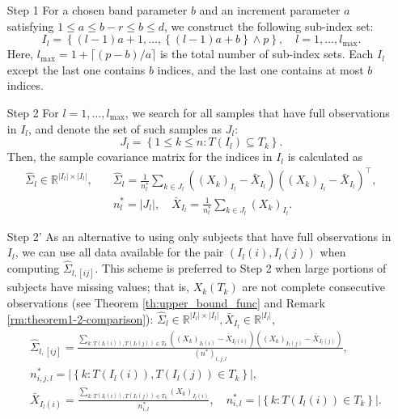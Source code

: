 \documentclass[11pt]{article}
\newcommand{\0}{{\mathbf{0}}}
\newcommand{\1}{{\mathbf{1}}}
\begin{document}
\begin{enumerate}
	\item[Step 1] For a chosen band parameter $b$ and an increment parameter $a$ satisfying $1\leq a \leq b-r \leq b\leq d$, we construct the following sub-index set:
	\begin{equation}\label{eq:I_l}
	I_l = \left\{(l-1)a + 1, \ldots, \left\{(l-1)a + b\right\}\wedge p \right\}, \quad l=1,\ldots, l_{\max}.
	\end{equation}
	Here, $l_{\max} = 1+ \lceil (p-b)/a \rceil$ is the total number of sub-index sets. Each $I_l$ except the last one contains $b$ indices, and the last one contains at most $b$ indices.
	
	\item[Step 2] For $l=1,\ldots, l_{\max}$, we search for all samples that have full observations in $I_l$, and denote the set of such samples as $J_l$:
	$$J_l = \left\{1\leq k\leq n: T(I_l) \subseteq T_k\right\}.$$ 
	Then, the sample covariance matrix for the indices in $I_l$ is calculated as
	\begin{equation}\label{eq:hat_Sigma_complete}
	\begin{split}
	\hat{\Sigma}_l\in \mathbb{R}^{|I_l| \times |I_l|}, \quad & \hat{\Sigma}_l = \frac {1}{n_l^\ast}\sum_{k \in J_l}\left((X_{k})_{I_l} - \bar{X}_{I_l}\right)\left((X_{k})_{I_l} - \bar{X}_{I_l}\right)^\top, \\
	& n_l^\ast = |J_l|, \quad \bar{X}_{I_l} = \frac{1}{n_l^\ast}\sum_{k \in J_l}(X_k)_{I_l}.
	\end{split}
	\end{equation}
	
	\item[Step 2']  As an alternative to using only subjects that have full observations in $I_l$, we can use all data available for the pair $(I_l(i), I_l(j))$ when computing $\hat{\Sigma}_{l,[ij]}$. This scheme is preferred to Step 2 when large portions of subjects have missing values; that is, $X_k(T_k)$ are not complete consecutive observations (see Theorem \ref{th:upper_bound_func} and Remark \ref{rm:theorem1-2-comparison}): $\hat{\Sigma}_l\in \mathbb{R}^{|I_l| \times |I_l|}, \bar{X}_{I_l} \in \mathbb{R}^{|I_l|},$
	\begin{equation}\label{eq:hat_Sigma_incomplete}
	\begin{split}
	& \hat{\Sigma}_{l,[ij]} = \frac{\sum_{k: T(I_l(i)), T(I_l(j)) \in T_k} \left((X_k)_{I_l(i)} - \bar{X}_{I_l(i)}\right)\left((X_k)_{I_l(j)} - \bar{X}_{I_l(j)}\right)}{(n^\ast)_{i,j,l}}, \\
	& n^\ast_{i,j,l} = \left|\left\{k: T(I_l(i)), T(I_l(j)) \in T_k\right\}\right|,\\
	& \bar{X}_{I_l(i)} = \frac{\sum_{k: T(I_l(i)), T(I_l(j)) \in T_k} (X_k)_{I_l(i)}}{n^\ast_{i, l}}, \quad n^\ast_{i,l} = \left|\left\{k: T(I_l(i))  \in T_k\right\}\right|.
	\end{split}
	\end{equation}
	

\end{enumerate}
\end{document}
